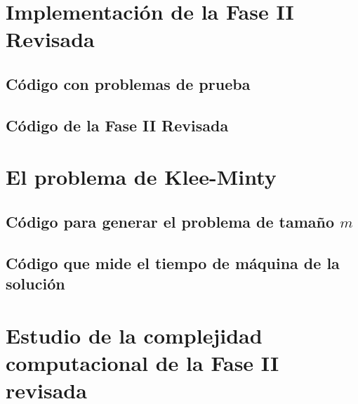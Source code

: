 \documentclass[titlepage]{article}
\begin{document}
\appendixpage
\begin{appendices}

    \section{Implementación de la Fase II Revisada}
        \subsection{Código con problemas de prueba}
            
        \subsection{Código de la Fase II Revisada}
            
        
    \section{El problema de Klee-Minty}
        \subsection{Código para generar el problema de tamaño $m$}
            
        \subsection{Código que mide el tiempo de máquina de la solución}
            
        
    \section{Estudio de la complejidad computacional de la Fase II revisada}
        
    
\end{appendices}
\end{document}

